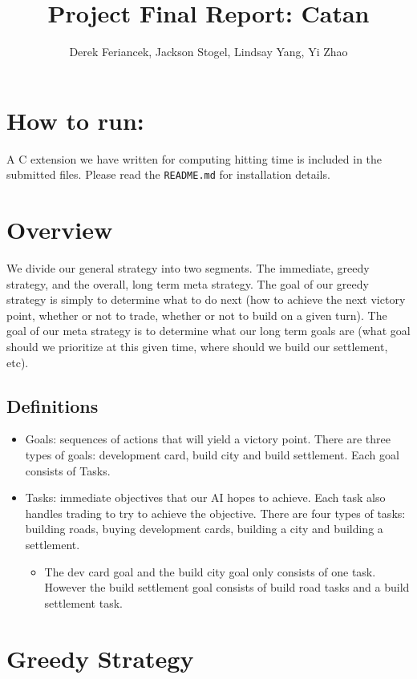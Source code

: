 \documentclass{article}
\title{Project Final Report: Catan}
\author{Derek Feriancek, Jackson Stogel, Lindsay Yang, Yi Zhao}
\date{}
\begin{document}
\maketitle

\section*{How to run:}

A C extension we have written for computing hitting time is included in the submitted files. Please read the \verb|README.md| for installation details.

\section*{Overview}

We divide our general strategy into two segments. The immediate, greedy strategy, and the overall, long term meta strategy. The goal of our greedy strategy is simply to determine what to do next (how to achieve the next victory point, whether or not to trade, whether or not to build on a given turn). The goal of our meta strategy is to determine what our long term goals are (what goal should we prioritize at this given time, where should we build our settlement, etc).

\subsection*{Definitions}

\begin{itemize}
    \item Goals: sequences of actions that will yield a victory point. There are three types of goals: development card, build city and build settlement. Each goal consists of Tasks.
    \item Tasks: immediate objectives that our AI hopes to achieve. Each task also handles trading to try to achieve the objective. There are four types of tasks: building roads, buying development cards, building a city and building a settlement.
    \begin{itemize}
        \item The dev card goal and the build city goal only consists of one task. However the build settlement goal consists of build road tasks and a build settlement task.
    \end{itemize}
\end{itemize}

\section*{Greedy Strategy}
\end{document}
